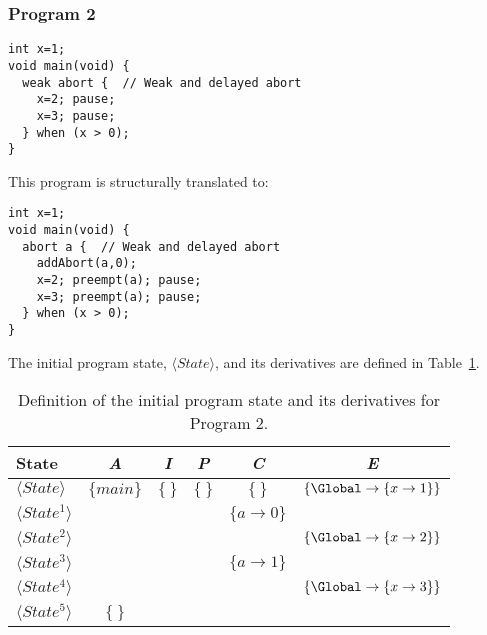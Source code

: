 \subsubsection{Program 2}
\begin{lstlisting}[style=snippet]
int x=1;
void main(void) {
  weak abort {  // Weak and delayed abort
    x=2; pause;
    x=3; pause;
  } when (x > 0);
}
\end{lstlisting}
This program is structurally translated to:
\begin{lstlisting}[style=snippet]
int x=1;
void main(void) {
  abort a {  // Weak and delayed abort
    addAbort(a,0);
    x=2; preempt(a); pause;
    x=3; preempt(a); pause;
  } when (x > 0);
}
\end{lstlisting}
The initial program state, $\langle State \rangle$,
and its derivatives are defined in Table~\ref{table:forec_program_2}.
\newline

\begin{table}[t]
	\centering
	\renewcommand{\arraystretch}{1.25}
	
	\begin{tabular}{| l | c | c | c | c | c |}
		\hline
		\textbf{State}						& \textbf{\textit{A}}			& \textbf{\textit{I}} 		& \textbf{\textit{P}} 	& \textbf{\textit{C}} 		& \textbf{\textit{E}}										\\ \hline
		$\langle State \rangle$				& $\lbrace main \rbrace$		& $\lbrace ~ \rbrace$		& $\lbrace ~ \rbrace$	& $\lbrace ~ \rbrace$		& $\lbrace \Global \to \lbrace x \to 1 \rbrace \rbrace$		\\ \cline{1-1} \cline{5-5}
		$\langle State^1 \rangle$			& 								& 							& 						& $\lbrace a \to 0 \rbrace$	& 															\\ \cline{1-1} \cline{6-6}
		$\langle State^2 \rangle$			& 								& 							& 						& 							& $\lbrace \Global \to \lbrace x \to 2 \rbrace \rbrace$		\\ \cline{1-1} \cline{5-5}
		$\langle State^3 \rangle$			& 								& 							& 						& $\lbrace a \to 1 \rbrace$	& 															\\ \cline{1-1} \cline{6-6}
		$\langle State^4 \rangle$			& 								& 							& 						& 							& $\lbrace \Global \to \lbrace x \to 3 \rbrace \rbrace$		\\ \cline{1-2}
		$\langle State^5 \rangle$			& $\lbrace ~ \rbrace$			& 							& 						& 							& 															\\ \hline
	\end{tabular}
	
	\caption{Definition of the initial program state and its derivatives for Program 2.}
	\label{table:forec_program_2}
\end{table}

